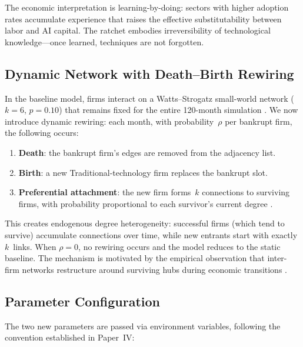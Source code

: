 \documentclass[12pt,a4paper]{article}
\begin{document}
The economic interpretation is learning-by-doing: sectors with higher
adoption rates accumulate experience that raises the effective
substitutability between labor and AI capital. The ratchet embodies
irreversibility of technological knowledge---once learned, techniques
are not forgotten.

\subsection{Dynamic Network with Death--Birth Rewiring}\label{sec:network}

In the baseline model, firms interact on a Watts--Strogatz small-world
network ($k = 6$, $p = 0.10$) that remains fixed for the entire 120-month
simulation \parencite{Watts1998}. We now introduce dynamic rewiring:
each month, with probability~$\rho$ per bankrupt firm, the following
occurs:
\begin{enumerate}
  \item \textbf{Death}: the bankrupt firm's edges are removed from
  the adjacency list.
  \item \textbf{Birth}: a new Traditional-technology firm replaces the
  bankrupt slot.
  \item \textbf{Preferential attachment}: the new firm forms~$k$
  connections to surviving firms, with probability proportional to each
  survivor's current degree \parencite{Barabasi1999}.
\end{enumerate}

This creates endogenous degree heterogeneity: successful firms (which
tend to survive) accumulate connections over time, while new entrants
start with exactly $k$~links. When $\rho = 0$, no rewiring occurs and
the model reduces to the static baseline. The mechanism is motivated by
the empirical observation that inter-firm networks restructure around
surviving hubs during economic transitions \parencite{Battiston2012,
Jackson2002}.

\subsection{Parameter Configuration}\label{sec:params}

The two new parameters are passed via environment variables, following
the convention established in Paper~IV:
\end{document}
